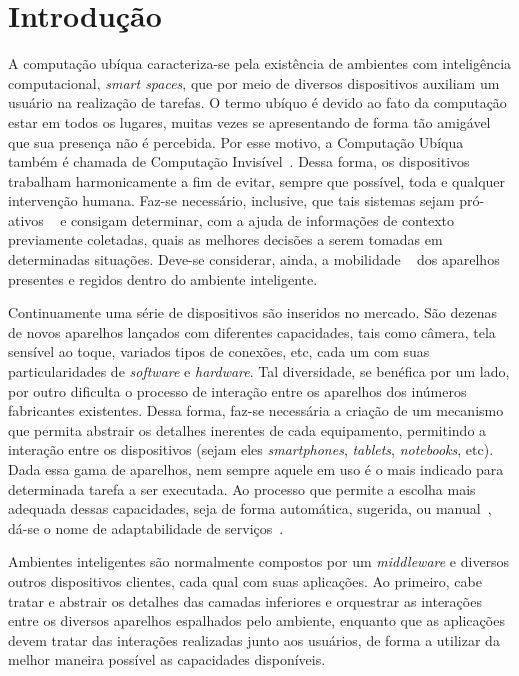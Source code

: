 \chapter{Introdução}

A computação ubíqua caracteriza-se pela existência de ambientes com inteligência computacional, \emph{smart spaces}, que por meio de diversos dispositivos auxiliam um usuário na realização de tarefas. O termo ubíquo é devido ao fato da computação estar em todos os lugares, muitas vezes se apresentando de forma tão amigável que sua presença não é percebida. Por esse motivo, a Computação Ubíqua também é chamada de Computação Invisível~\cite{gomes2007, weiser1993, weiser1999}. Dessa forma, os dispositivos trabalham harmonicamente a fim de evitar, sempre que possível, toda e qualquer intervenção humana. Faz-se necessário, inclusive, que tais sistemas sejam pró-ativos ~\cite{gomes2007, buzeto2010} e consigam determinar, com a ajuda de informações de contexto previamente coletadas, quais as melhores decisões a serem tomadas em determinadas situações. Deve-se considerar, ainda, a mobilidade ~\cite{gomes2007, buzeto2010, weiser1999} dos aparelhos presentes e regidos dentro do ambiente inteligente.

Continuamente uma série de dispositivos são inseridos no mercado. São dezenas de novos aparelhos lançados com diferentes capacidades, tais como câmera, tela sensível ao toque, variados tipos de conexões, etc, cada um com suas particularidades de \emph{software} e \emph{hardware}. Tal diversidade, se benéfica por um lado, por outro dificulta o processo de interação entre os aparelhos dos inúmeros fabricantes existentes. Dessa forma, faz-se necessária a criação de um mecanismo que permita abstrair os detalhes inerentes de cada equipamento, permitindo a interação entre os dispositivos (sejam eles \emph{smartphones}, \emph{tablets}, \emph{notebooks}, etc). Dada essa gama de aparelhos, nem sempre aquele em uso é o mais indicado para determinada tarefa a ser executada. Ao processo que permite a escolha mais adequada dessas capacidades, seja de forma automática, sugerida, ou manual~\cite{lucas2011}, dá-se o nome de adaptabilidade de serviços~\cite{adaptabilidadeDeServicos}.

Ambientes inteligentes são normalmente compostos por um \emph{middleware} e diversos outros dispositivos clientes, cada qual com suas aplicações. Ao primeiro, cabe tratar e abstrair os detalhes das camadas inferiores e orquestrar as interações entre os diversos aparelhos espalhados pelo ambiente, enquanto que as aplicações devem tratar das interações realizadas junto aos usuários, de forma a utilizar da melhor maneira possível as capacidades disponíveis.

